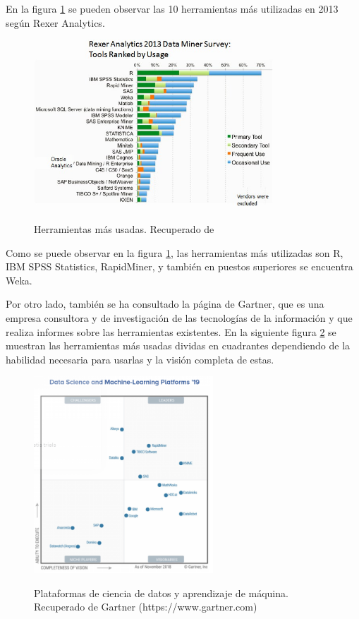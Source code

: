 En la figura \ref{fig:top10tools} se pueden observar las 10 herramientas más utilizadas en 2013 según Rexer Analytics. \cite{rexer2013}

\begin{figure}[htb]
	\centering
	\caption{Herramientas más usadas. Recuperado de \protect\cite{rexer2013}}
	\includegraphics[width=0.8\textwidth]{recursos/top10tools}
	\label{fig:top10tools}
\end{figure}


Como se puede observar en la figura \ref{fig:top10tools}, las herramientas más utilizadas son R, IBM SPSS Statistics, RapidMiner, y también en puestos superiores se encuentra Weka.

Por otro lado, también se ha consultado la página de Gartner, que es una empresa consultora y de investigación de las tecnologías de la información y que realiza informes sobre las herramientas existentes. En la siguiente figura \ref{fig:gartner} se muestran las herramientas más usadas dividas en cuadrantes dependiendo de la habilidad necesaria para usarlas y la visión completa de estas.

\begin{figure}[htb]
	\centering
	\caption{Plataformas de ciencia de datos y aprendizaje de máquina. Recuperado de Gartner (https://www.gartner.com)}
	\includegraphics[width=0.6\textwidth]{recursos/gartner}
	\label{fig:gartner}
\end{figure}


